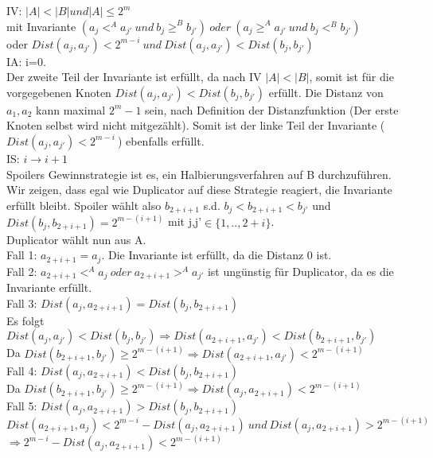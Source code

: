 \documentclass[12pt]{article}
\begin{document}
IV: $|A|<|B| und |A| \leq 2^{m}$\\
mit Invariante $(a_j <^A a_{j'}\ und\ b_j \geq^B b_{j'})\ oder\ (a_j \geq^A a_{j'}\ und\ b_j <^B b_{j'})$\\
oder $Dist(a_j,a_{j'}) < 2^{m-i}\ und\ Dist(a_j,a_{j'}) < Dist(b_j,b_{j'})$\\
IA: i=0.\\
Der zweite Teil der Invariante ist erfüllt, da nach IV $|A|<|B|$, somit ist für die vorgegebenen Knoten $Dist(a_j,a_{j'}) < Dist(b_j,b_{j'})$ erfüllt. 
Die Distanz von $a_1,a_2$ kann maximal $2^{m}-1$ sein, nach Definition der Distanzfunktion (Der erste Knoten selbst wird nicht mitgezählt). Somit ist der linke Teil der Invariante ($Dist(a_j,a_{j'}) < 2^{m-i}\ $) ebenfalls erfüllt. \\
IS: $i\rightarrow i+1$ \\
Spoilers Gewinnstrategie ist es, ein Halbierungsverfahren auf B durchzuführen. Wir zeigen, dass egal wie Duplicator auf diese Strategie reagiert, die Invariante erfüllt bleibt. 
Spoiler wählt also $b_{2+i+1}$ s.d. $b_j < b_{2+i+1} < b_{j'}$  und $Dist(b_j, b_{2+i+1}) = 2^{m-(i+1)}$ mit j,j'$\in \{1,..,2+i\}$.\\
Duplicator wählt nun aus A.\\
Fall 1: $a_{2+i+1}=a_j$. Die Invariante ist erfüllt, da die Distanz 0 ist.\\
Fall 2: $a_{2+i+1} <^A a_j\ oder\  a_{2+i+1} >^A a_{j'}$ ist ungünstig für Duplicator, da es die Invariante erfüllt.\\
Fall 3: $Dist(a_j,a_{2+i+1}) = Dist(b_j,b_{2+i+1})$\\
  Es folgt $Dist(a_j,a_{j'}) < Dist(b_j,b_{j'}) \Rightarrow Dist(a_{2+i+1},a_{j'}) < Dist(b_{2+i+1},b_{j'})$\\
  Da $Dist(b_{2+i+1},b_{j'})\geq 2^{m-(i+1)} \Rightarrow Dist(a_{2+i+1},a_{j'})<2^{m-(i+1)}$ \\
Fall 4: $Dist(a_j,a_{2+i+1}) < Dist(b_j,b_{2+i+1})$\\
  Da $Dist(b_{2+i+1},b_{j'}) \geq 2^{m-(i+1)} \Rightarrow Dist(a_j,a_{2+i+1}) < 2^{m-(i+1)} $\\
Fall 5: $Dist(a_j,a_{2+i+1}) > Dist(b_j,b_{2+i+1})$\\
  $Dist(a_{2+i+1},a_j) < 2^{m-i}-Dist(a_j,a_{2+i+1})\ und\ Dist(a_j,a_{2+i+1})>2^{m-(i+1)}$\\
  $\Rightarrow 2^{m-i}-Dist(a_j,a_{2+i+1}) < 2^{m-(i+1)}$\\
\end{document}
